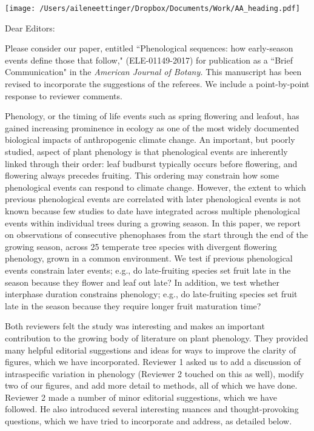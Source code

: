 \documentclass[10.95pt,a4paper]{letter}
\date{May 31, 2018}
\begin{document}
%

\begin{letter}{}
\texttt{[image: /Users/aileneettinger/Dropbox/Documents/Work/AA\_heading.pdf]}

\opening{Dear Editors:}
Please consider our paper, entitled ``Phenological sequences: how early-season events define those that follow,"  (ELE-01149-2017) for publication as a ``Brief Communication" in the \emph{American Journal of Botany.} This manuscript has been revised to incorporate the suggestions of the referees. We include a point-by-point response to reviewer comments.

Phenology, or the timing of life events such as spring flowering and leafout, has gained increasing prominence in ecology as one of the most widely documented biological impacts of anthropogenic climate change.  An important, but poorly studied, aspect of plant phenology is that phenological events are inherently linked through their order: leaf budburst typically occurs before flowering, and flowering always precedes fruiting. This ordering may constrain how some phenological events can respond to climate change. However, the extent to which previous phenological events are correlated with later phenological events is not known because few studies to date have integrated across multiple phenological events within individual trees during a growing season. In this paper, we report on observations of consecutive phenophases from the start through the end of the growing season, across 25 temperate tree species with divergent flowering phenology, grown in a common environment. We test if previous phenological events constrain later events; e.g., do late-fruiting species set fruit late in the season because they flower and leaf out late? In addition, we test whether interphase duration constrains phenology; e.g., do late-fruiting species set fruit late in the season because they require longer fruit maturation time? 

Both reviewers felt the study was interesting and makes an important contribution to the growing body of literature on plant phenology.  They provided many helpful editorial suggestions and ideas for ways to improve the clarity of figures, which we have incorporated. Reviewer 1 asked us to add a discussion of intraspecific variation in phenology (Reviewer 2 touched on this as well), modify two of our figures, and add more detail to methods, all of which we have done. Reviewer 2 made a number of minor editorial suggestions, which we have followed. He also introduced several interesting nuances and thought-provoking questions, which we have tried to incorporate and address, as detailed below. 


\end{letter}
\end{document}
